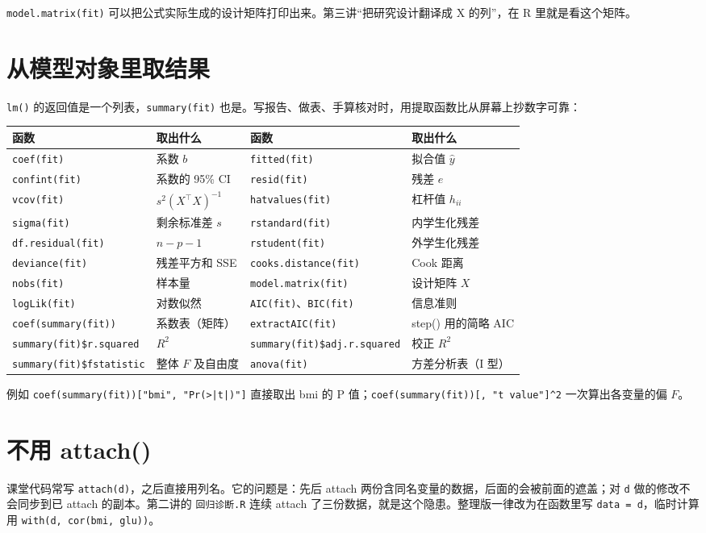 \Verb|model.matrix(fit)| 可以把公式实际生成的设计矩阵打印出来。第三讲“把研究设计翻译成 X 的列”，在 R 里就是看这个矩阵。

\section{从模型对象里取结果}
\Verb|lm()| 的返回值是一个列表，\Verb|summary(fit)| 也是。写报告、做表、手算核对时，用提取函数比从屏幕上抄数字可靠：


\begin{tabular}{llll}
\toprule
函数 & 取出什么 & 函数 & 取出什么\\
\midrule
\Verb|coef(fit)| & 系数 $b$ & \Verb|fitted(fit)| & 拟合值 $\hat y$\\
\Verb|confint(fit)| & 系数的 95\% CI & \Verb|resid(fit)| & 残差 $e$\\
\Verb|vcov(fit)| & $s^2(X^\top X)^{-1}$ & \Verb|hatvalues(fit)| & 杠杆值 $h_{ii}$\\
\Verb|sigma(fit)| & 剩余标准差 $s$ & \Verb|rstandard(fit)| & 内学生化残差\\
\Verb|df.residual(fit)| & $n-p-1$ & \Verb|rstudent(fit)| & 外学生化残差\\
\Verb|deviance(fit)| & 残差平方和 SSE & \Verb|cooks.distance(fit)| & Cook 距离\\
\Verb|nobs(fit)| & 样本量 & \Verb|model.matrix(fit)| & 设计矩阵 $X$\\
\Verb|logLik(fit)| & 对数似然 & \Verb|AIC(fit)|、\Verb|BIC(fit)| & 信息准则\\
\Verb|coef(summary(fit))| & 系数表（矩阵） & \Verb|extractAIC(fit)| & step() 用的简略 AIC\\
\Verb|summary(fit)$r.squared| & $R^2$ & \Verb|summary(fit)$adj.r.squared| & 校正 $R^2$\\
\Verb|summary(fit)$fstatistic| & 整体 $F$ 及自由度 & \Verb|anova(fit)| & 方差分析表（I 型）\\
\bottomrule
\end{tabular}


例如 \Verb!coef(summary(fit))["bmi", "Pr(>|t|)"]! 直接取出 bmi 的 P 值；\Verb|coef(summary(fit))[, "t value"]^2| 一次算出各变量的偏 $F$。

\section{不用 attach()}
课堂代码常写 \Verb|attach(d)|，之后直接用列名。它的问题是：先后 attach 两份含同名变量的数据，后面的会被前面的遮盖；对 \Verb|d| 做的修改不会同步到已 attach 的副本。第二讲的 \Verb|回归诊断.R| 连续 attach 了三份数据，就是这个隐患。整理版一律改为在函数里写 \Verb|data = d|，临时计算用 \Verb|with(d, cor(bmi, glu))|。

